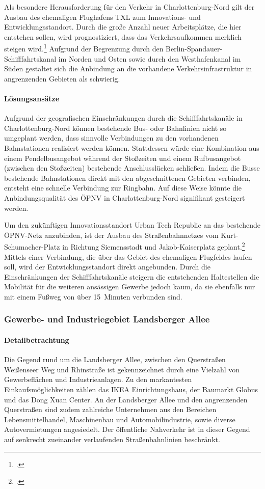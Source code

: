 Als besondere Herausforderung für den Verkehr in Charlottenburg-Nord gilt der Ausbau des ehemaligen Flughafens TXL zum Innovations- und Entwicklungsstandort. Durch die große Anzahl neuer Arbeitsplätze, die hier entstehen sollen, wird prognostiziert, dass das Verkehrsaufkommen merklich steigen wird.\footcite{UrbanTechRepublic} Aufgrund der Begrenzung durch den Berlin-Spandauer-Schifffahrtskanal im Norden und Osten sowie durch den Westhafenkanal im Süden gestaltet sich die Anbindung an die vorhandene Verkehrsinfrastruktur in angrenzenden Gebieten als schwierig.

\paragraph{Lösungsansätze}

Aufgrund der geografischen Einschränkungen durch die Schifffahrtskanäle in Charlottenburg-Nord können bestehende Bus- oder Bahnlinien nicht so umgeplant werden, dass sinnvolle Verbindungen zu den vorhandenen Bahnstationen realisiert werden können. Stattdessen würde eine Kombination aus einem Pendelbusangebot während der Stoßzeiten und einem Rufbusangebot (zwischen den Stoßzeiten) bestehende Anschlusslücken schließen. Indem die Busse bestehende Bahnstationen direkt mit den abgeschnittenen Gebieten verbinden, entsteht eine schnelle Verbindung zur Ringbahn. Auf diese Weise könnte die Anbindungsqualität des ÖPNV in Charlottenburg-Nord signifikant gesteigert werden.

Um den zukünftigen Innovationsstandort Urban Tech Republic an das bestehende ÖPNV-Netz anzubinden, ist der Ausbau des Straßenbahnnetzes vom Kurt-Schumacher-Platz in Richtung Siemensstadt und Jakob-Kaiserplatz geplant.\footcite{NahverkehrsplanBerlin} Mittels einer Verbindung, die über das Gebiet des ehemaligen Flugfeldes laufen soll, wird der Entwicklungsstandort direkt angebunden. Durch die Einschränkungen der Schifffahrtskanäle steigern die entstehenden Haltestellen die Mobilität für die weiteren ansässigen Gewerbe jedoch kaum, da sie ebenfalls nur mit einem Fußweg von über 15~Minuten verbunden sind.

\subsubsection{Gewerbe- und Industriegebiet Landsberger Allee}
\paragraph{Detailbetrachtung}
Die Gegend rund um die Landsberger Allee, zwischen den Querstraßen Weißenseer Weg und Rhinstraße ist gekennzeichnet durch eine Vielzahl von Gewerbeflächen und Industrieanlagen. Zu den markantesten Einkaufsmöglichkeiten zählen das IKEA Einrichtungshaus, der Baumarkt Globus und das Dong Xuan Center. An der Landsberger Allee und den angrenzenden Querstraßen sind zudem zahlreiche Unternehmen aus den Bereichen Lebensmittelhandel, Maschinenbau und Automobilindustrie, sowie diverse Autovermietungen angesiedelt. Der öffentliche Nahverkehr ist in dieser Gegend auf senkrecht zueinander verlaufenden Straßenbahnlinien beschränkt.


